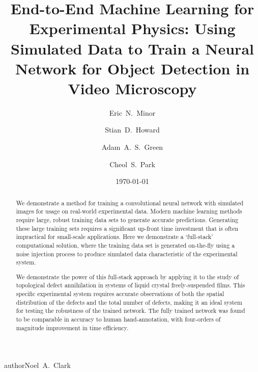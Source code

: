 \documentclass[prl,reprint,showpacs,floatfix,nofootinbib]{revtex4-1}
\begin{document}
\title{End-to-End Machine Learning for Experimental Physics: Using Simulated Data to Train a Neural Network for Object Detection in Video Microscopy}
\date{\today}
\author{Eric~N.~Minor}
\author{Stian~D.~Howard}
\author{Adam~A.~S.~Green}
\author{Cheol~S.~Park}
author{Noel~A.~Clark}

\begin{abstract}
    
    We demonstrate a method for training a convolutional neural network with simulated images for usage on real-world experimental data. Modern machine learning methods require large, robust training data sets to generate accurate predictions. Generating these large training sets requires a significant up-front time investment that is often impractical for small-scale applications. Here we demonstrate a `full-stack' computational solution, where the training data set is generated on-the-fly using a noise injection process to produce simulated data characteristic of the experimental system.
    
    
   We demonstrate the power of this full-stack
   approach by applying it to the study of topological defect annihilation in systems of liquid crystal freely-suspended films. This specific experimental system requires accurate observations of both the spatial distribution of the defects and the total number of defects, making it an ideal system for testing the robustness of the trained network. The fully trained network was found to be comparable in accuracy to human hand-annotation, with four-orders of magnitude improvement in time efficiency.  
    
\end{abstract}
\end{document}
